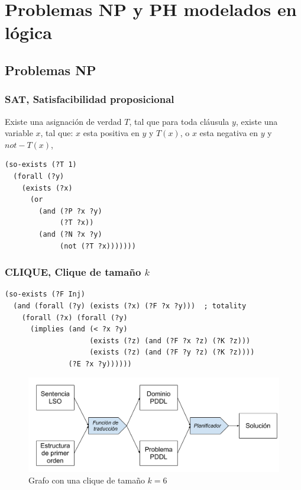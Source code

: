 
\chapter{Problemas NP y PH modelados en lógica}
\label{apendiceA}

\section{Problemas NP}

\subsection{SAT, Satisfacibilidad proposicional}
Existe una asignación de verdad $T$, tal que para toda cláusula $y$, existe una variable $x$, tal que:
$x$ esta positiva en $y$ y $T(x)$, o $x$ esta negativa en $y$ y $not-T(x)$,
\begin{verbatim}
(so-exists (?T 1)
  (forall (?y)
    (exists (?x)
      (or
        (and (?P ?x ?y)
             (?T ?x)) 
        (and (?N ?x ?y)
             (not (?T ?x)))))))
\end{verbatim}

\subsection{CLIQUE, Clique de tamaño $k$}

\begin{verbatim}
(so-exists (?F Inj)
  (and (forall (?y) (exists (?x) (?F ?x ?y)))  ; totality
    (forall (?x) (forall (?y)
      (implies (and (< ?x ?y)
                    (exists (?z) (and (?F ?x ?z) (?K ?z)))
                    (exists (?z) (and (?F ?y ?z) (?K ?z))))
               (?E ?x ?y))))))
\end{verbatim}
\begin{figure}[h!]
\centering
\includegraphics[width=\textwidth]{figuras/esquema_herramienta.pdf}
\caption[Grafo con una \textit{clique} de tamaño $k = 6$]{Grafo con una clique de tamaño
$k = 6$}
\label{clique}
\end{figure}

